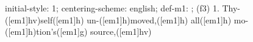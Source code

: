 initial-style: 1;
centering-scheme: english;
def-m1: \grealign;
(f3) 1. Thy-([em1]hv)self([em1]h) un-([em1]h)moved,([em1]h) all([em1]h) mo-([em1]h)tion's([em1]g) source,([em1]hv)